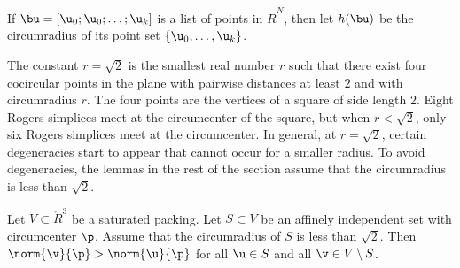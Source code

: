 \begin{definition}[h]
% 
If $\bu=[\u_0;\u_0;\ldots;\u_k]$ is a list of points in $\ring{R}^N$, then
let $h(\bu)$ be the
circumradius of its point set $\{ \u_0,\ldots, \u_k\}$.
\end{definition}
%

The constant $r=\sqrt2$ is the smallest real number $r$ such that
there exist four cocircular points in the plane with pairwise
distances at least $2$ and with circumradius $r$.  The four points are
the vertices of a square of side length $2$.  Eight Rogers simplices
meet at the circumcenter of the square, but when $r<\sqrt2$, only six
Rogers simplices meet at the circumcenter.  In general, at $r=\sqrt2$,
certain degeneracies start to appear that cannot occur for a smaller
radius.  To avoid degeneracies, the lemmas in the rest of the section
assume that the circumradius is less than $\sqrt2$.

\begin{lemma}[nondegeneracy]\label{lemma:sqrt2-close} 
  Let $V\subset\ring{R}^3$ be a saturated packing.  Let $S\subset V$
  be an affinely independent set with circumcenter $\p$.  Assume that
  the circumradius of $S$ is less than $\sqrt2$.  Then
  $\norm{\v}{\p}>\norm{\u}{\p}$ for all $\u\in S$ and all $\v\in
  V\setminus S$.
\end{lemma}


